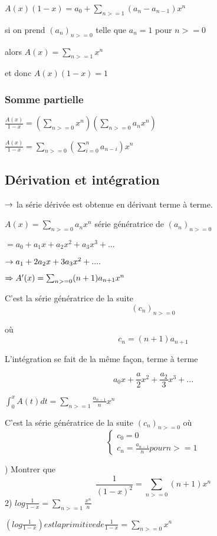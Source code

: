 $A(x)(1-x) = a_0 + \sum_{n>=1}^{}(a_n - a_{n-1})x^n$

si on prend $(a_n)_{n>=0}$ telle que $a_n=1$ pour $n>=0$ 

alors $A(x) = \sum_{n>=1}^{}x^n$

 et donc $A(x)(1-x)= 1$
 
\subsubsection{Somme partielle}
$\frac{A(x)}{1-x} = (\sum_{n>=0} x^n)(\sum_{n>=0} a_n x^n)$

$\frac{A(x)}{1-x} = \sum_{n>=0} (\sum_{i=0}^n a_{n-i}) x^n$
 
\subsection{Dérivation et intégration}
$\rightarrow$ la série dérivée est obtenue en dérivant terme à terme.

$A(x) = \sum_{n>=0} a_n x^n$ série génératrice de $(a_n)_{n>=0}$

$= a_0 + a_1x + a_2x^2 + a_3x^3 + ...$

$\rightarrow a_1 + 2a_2x + 3a_3x^2 + ....$

$\Rightarrow A'(x) = \sum_{n>=0}(n+1)a_{n+1}x^n$

C'est la série génératrice de la suite \[(c_n)_{n>=0}\] 

où \[c_n = (n+1) a_{n+1}\]

L'intégration se fait de la même façon, terme à terme

\[a_0x + \frac{a}{2}x^2 + \frac{a_2}{3}x^3 +... \]

$\int_{0}^x A(t)dt = \sum_{n>=1}^{}\frac{a_{n-1}}{n}x^n$

C'est la série génératrice de la suite $(c_n)_{n>=0}$ où
\[
\begin{cases}
c_0 = 0\\
c_n = \frac{a_{n-1}}{n} pour n>= 1
\end{cases}
\]


) Montrer que
\[ \frac{1}{(1-x)^2} = \sum_{n>=0}(n+1)x^n\]
2)
$ log \frac{1}{1-x} = \sum_{n>=1} \frac{x^n}{n}$

$(log \frac{1}{1-x}) est la primitive de \frac{1}{1-x} = \sum_{n>=0} x^n$

